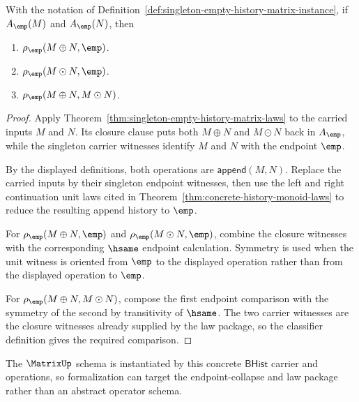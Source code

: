 \begin{theorem}
\label{thm:singleton-empty-history-matrix-endpoint-collapse}
With the notation of
Definition~\ref{def:singleton-empty-history-matrix-instance}, if
$A_{\emp}(M)$ and $A_{\emp}(N)$, then
\begin{enumerate}
  \item $\rho_{\emp}(M\oplus N,\emp)$.
  \item $\rho_{\emp}(M\odot N,\emp)$.
  \item $\rho_{\emp}(M\oplus N,M\odot N)$.
\end{enumerate}
\end{theorem}
\begin{proof}
Apply Theorem~\ref{thm:singleton-empty-history-matrix-laws} to the carried
inputs $M$ and $N$. Its closure clause puts both $M\oplus N$ and $M\odot N$
back in $A_{\emp}$, while the singleton carrier witnesses identify $M$ and
$N$ with the endpoint $\emp$.

By the displayed definitions, both operations are
$\mathsf{append}(M,N)$. Replace the carried inputs by their singleton endpoint
witnesses, then use the left and right continuation unit laws cited in
Theorem~\ref{thm:concrete-history-monoid-laws} to reduce the resulting append
history to $\emp$.

For $\rho_{\emp}(M\oplus N,\emp)$ and
$\rho_{\emp}(M\odot N,\emp)$, combine the closure witnesses with the
corresponding $\hsame$ endpoint calculation. Symmetry is used when the unit
witness is oriented from $\emp$ to the displayed operation rather than from
the displayed operation to $\emp$.

For $\rho_{\emp}(M\oplus N,M\odot N)$, compose the first endpoint comparison
with the symmetry of the second by transitivity of $\hsame$. The two carrier
witnesses are the closure witnesses already supplied by the law package, so
the classifier definition gives the required comparison.
\end{proof}

The $\MatrixUp$ schema is instantiated by this concrete $\mathsf{BHist}$
carrier and operations, so formalization can target the endpoint-collapse and
law package rather than an abstract operator schema.

